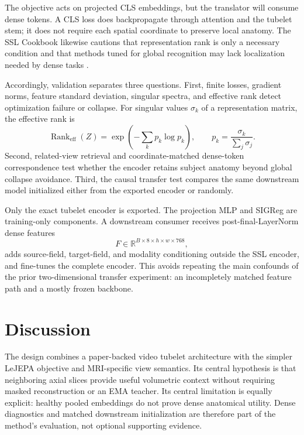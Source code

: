 \documentclass[10pt]{article}
\newcommand{\R}{\mathbb{R}}
\begin{document}
The objective acts on projected CLS embeddings, but the translator will consume
dense tokens. A CLS loss does backpropagate through attention and the tubelet
stem; it does not require each spatial coordinate to preserve local anatomy.
The SSL Cookbook likewise cautions that representation rank is only a necessary
condition and that methods tuned for global recognition may lack localization
needed by dense tasks \cite{cookbook}.

Accordingly, validation separates three questions. First, finite losses,
gradient norms, feature standard deviation, singular spectra, and effective
rank detect optimization failure or collapse. For singular values $\sigma_k$
of a representation matrix, the effective rank is
\begin{equation}
  \operatorname{Rank}_{\mathrm{eff}}(Z)
  =\exp\!\left(-\sum_k p_k\log p_k\right),
  \qquad p_k=\frac{\sigma_k}{\sum_j\sigma_j}.
\end{equation}
Second, related-view retrieval and coordinate-matched dense-token
correspondence test whether the encoder retains subject anatomy beyond global
collapse avoidance. Third, the causal transfer test compares the same
downstream model initialized either from the exported encoder or randomly.

Only the exact tubelet encoder is exported. The projection MLP and SIGReg are
training-only components. A downstream consumer receives post-final-LayerNorm
dense features
\begin{equation}
  F\in\R^{B\times8\times h\times w\times768},
\end{equation}
adds source-field, target-field, and modality conditioning outside the SSL
encoder, and fine-tunes the complete encoder. This avoids repeating the main
confounds of the prior two-dimensional transfer experiment: an incompletely
matched feature path and a mostly frozen backbone.

\section{Discussion}

The design combines a paper-backed video tubelet architecture with the simpler
LeJEPA objective and MRI-specific view semantics. Its central hypothesis is
that neighboring axial slices provide useful volumetric context without
requiring masked reconstruction or an EMA teacher. Its central limitation is
equally explicit: healthy pooled embeddings do not prove dense anatomical
utility. Dense diagnostics and matched downstream initialization are therefore
part of the method's evaluation, not optional supporting evidence.
\end{document}

